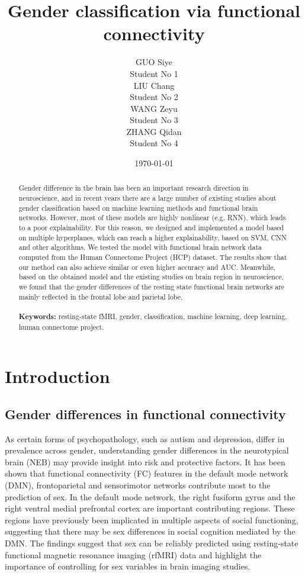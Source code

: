 \documentclass[11pt]{article}
\title{\Huge Gender classification via functional connectivity}
\author{
    \parbox{0.2\textwidth}{
        \centering GUO Siye \\
        \centering Student No 1
    }
    \parbox{0.2\textwidth}{
        \centering LIU Chang \\
        \centering Student No 2
    }
    \parbox{0.2\textwidth}{
        \centering WANG Zeyu \\
        \centering Student No 3
    }
    \parbox{0.2\textwidth}{
        \centering ZHANG Qidan \\
        \centering Student No 4
    }
}
\date{\today}
\begin{document}
\maketitle

\begin{abstract}
    Gender difference in the brain has been an important research direction in neuroscience, and in recent years there are a large number of existing studies about gender classification based on machine learning methods and functional brain networks. However, most of these models are highly nonlinear (e.g. RNN), which leads to a poor explainability. For this reason, we designed and implemented a model based on multiple hyperplanes, which can reach a higher explainability, based on SVM, CNN and other algorithms. We tested the model with functional brain network data computed from the Human Connectome Project (HCP) dataset. The results show that our method can also achieve similar or even higher accuracy and AUC. Meanwhile, based on the obtained model and the existing studies on brain region in neuroscience, we found that the gender differences of the resting state functional brain networks are mainly reflected in the frontal lobe and parietal lobe.
    \\\\
    \textbf{Keywords:} resting-state fMRI, gender, classification, machine learning, deep learning, human connectome project.
\end{abstract}


\newpage

\tableofcontents
\thispagestyle{empty}
\setcounter{page}{0}

\newpage

\section{Introduction}

\subsection{Gender differences in functional connectivity\cite{Gong2009-gu}\cite{Dibaji2023-bn}\cite{Ebel2023-pu}\cite{Sendi2023-nu}\cite{Yan2019-yc}}

As certain forms of psychopathology, such as autism and depression, differ in prevalence across gender, understanding gender differences in the neurotypical brain (NEB) may provide insight into risk and protective factors. It has been shown that functional connectivity (FC) features in the default mode network (DMN), frontoparietal and sensorimotor networks contribute most to the prediction of sex. In the default mode network, the right fusiform gyrus and the right ventral medial prefrontal cortex are important contributing regions. These regions have previously been implicated in multiple aspects of social functioning, suggesting that there may be sex differences in social cognition mediated by the DMN. The findings suggest that sex can be reliably predicted using resting-state functional magnetic resonance imaging (rfMRI) data and highlight the importance of controlling for sex variables in brain imaging studies.
\end{document}

